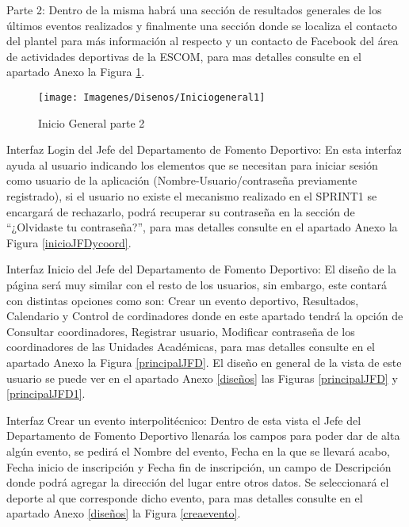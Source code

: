 	Parte 2:
	Dentro de la misma habrá una sección de resultados generales de los últimos eventos realizados y finalmente una  sección donde se localiza el contacto del plantel para más información al respecto y un contacto de Facebook del área de actividades deportivas de la ESCOM, para mas detalles consulte en el apartado Anexo la Figura \ref{inicioGeneral1}.
	
	\begin{figure}[hbt!]
		\centering
		\texttt{[image: Imagenes/Disenos/Iniciogeneral1]}
		\caption{Inicio General parte 2}
		\label{inicioGeneral1}
	\end{figure}
	
	\noindent Interfaz Login del Jefe del Departamento de Fomento Deportivo: En esta interfaz ayuda al usuario indicando los elementos que se necesitan para iniciar sesión como usuario de la aplicación (Nombre-Usuario/contraseña previamente registrado), si el usuario no existe el mecanismo realizado en el SPRINT1 se encargará de rechazarlo, podrá recuperar su contraseña en la sección de “¿Olvidaste tu contraseña?”, para mas detalles consulte en el apartado Anexo la Figura 	\ref{inicioJFDycoord}. 
	\newline
	
	\noindent Interfaz Inicio del Jefe del Departamento de Fomento Deportivo: El diseño de la página será muy similar con el resto de los usuarios, sin embargo, este contará con distintas opciones como son: Crear un evento deportivo, Resultados, Calendario y Control de cordinadores donde en este apartado tendrá la opción de Consultar coordinadores, Registrar usuario, Modificar contraseña de los coordinadores de las Unidades Académicas, para mas detalles consulte en el apartado Anexo la Figura 	\ref{principalJFD}. El diseño en general de la vista de este usuario se puede ver en el apartado Anexo \ref{diseños} las Figuras \ref{principalJFD} y \ref{principalJFD1}.
	\newline
	
	\noindent Interfaz Crear un evento interpolitécnico: Dentro de esta vista el Jefe del Departamento de Fomento Deportivo llenaráa los campos para poder dar de alta algún evento, se pedirá el Nombre del evento, Fecha en la que se llevará acabo, Fecha inicio de inscripción y Fecha fin de inscripción, un campo de Descripción donde podrá agregar la dirección del lugar entre otros datos. Se seleccionará el deporte al que corresponde dicho evento, para mas detalles consulte en el apartado Anexo \ref{diseños} la Figura \ref{creaevento}.
	\newline
	
